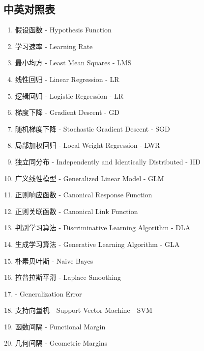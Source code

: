 \subsection{中英对照表}
\begin{enumerate}
	\item 假设函数 - Hypothesis Function
	\item 学习速率 - Learning Rate
	\item 最小均方 - Least Mean Squares - LMS
	\item 线性回归 - Linear Regression - LR
	\item 逻辑回归 - Logistic Regression - LR
	\item 梯度下降 - Gradient Descent - GD
	\item 随机梯度下降 - Stochastic Gradient Descent - SGD
	\item 局部加权回归 - Local Weight Regression - LWR
	\item 独立同分布 - Independently and Identically Distributed - IID
	\item 广义线性模型 - Generalized Linear Model - GLM
	\item 正则响应函数 - Canonical Response Function
	\item 正则关联函数 - Canonical Link Function
	\item 判别学习算法 - Discriminative Learning Algorithm - DLA
	\item 生成学习算法 - Generative Learning Algorithm - GLA
	\item 朴素贝叶斯 - Naive Bayes
	\item 拉普拉斯平滑 - Laplace Smoothing
	\item  - Generalization Error
	\item 支持向量机 - Support Vector Machine - SVM
	\item 函数间隔 - Functional Margin
	\item 几何间隔 - Geometric Margins
\end{enumerate}